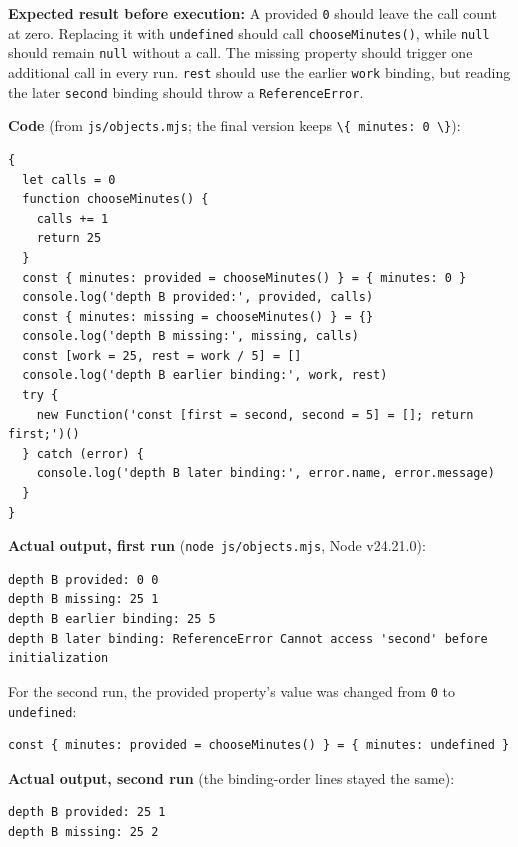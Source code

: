 \documentclass[
  11pt,
]{article}
\newcommand{\passthrough}[1]{#1}
\begin{document}
\textbf{Expected result before execution:} A provided
\passthrough{\lstinline!0!} should leave the call count at zero.
Replacing it with \passthrough{\lstinline!undefined!} should call
\passthrough{\lstinline!chooseMinutes()!}, while
\passthrough{\lstinline!null!} should remain
\passthrough{\lstinline!null!} without a call. The missing property
should trigger one additional call in every run.
\passthrough{\lstinline!rest!} should use the earlier
\passthrough{\lstinline!work!} binding, but reading the later
\passthrough{\lstinline!second!} binding should throw a
\passthrough{\lstinline!ReferenceError!}.

\textbf{Code} (from \passthrough{\lstinline!js/objects.mjs!}; the final
version keeps \passthrough{\lstinline!\{ minutes: 0 \}!}):

\begin{lstlisting}
{
  let calls = 0
  function chooseMinutes() {
    calls += 1
    return 25
  }
  const { minutes: provided = chooseMinutes() } = { minutes: 0 }
  console.log('depth B provided:', provided, calls)
  const { minutes: missing = chooseMinutes() } = {}
  console.log('depth B missing:', missing, calls)
  const [work = 25, rest = work / 5] = []
  console.log('depth B earlier binding:', work, rest)
  try {
    new Function('const [first = second, second = 5] = []; return first;')()
  } catch (error) {
    console.log('depth B later binding:', error.name, error.message)
  }
}
\end{lstlisting}

\textbf{Actual output, first run}
(\passthrough{\lstinline!node js/objects.mjs!}, Node v24.21.0):

\begin{lstlisting}
depth B provided: 0 0
depth B missing: 25 1
depth B earlier binding: 25 5
depth B later binding: ReferenceError Cannot access 'second' before initialization
\end{lstlisting}

For the second run, the provided property's value was changed from
\passthrough{\lstinline!0!} to \passthrough{\lstinline!undefined!}:

\begin{lstlisting}
const { minutes: provided = chooseMinutes() } = { minutes: undefined }
\end{lstlisting}

\textbf{Actual output, second run} (the binding-order lines stayed the
same):

\begin{lstlisting}
depth B provided: 25 1
depth B missing: 25 2
\end{lstlisting}
\end{document}
